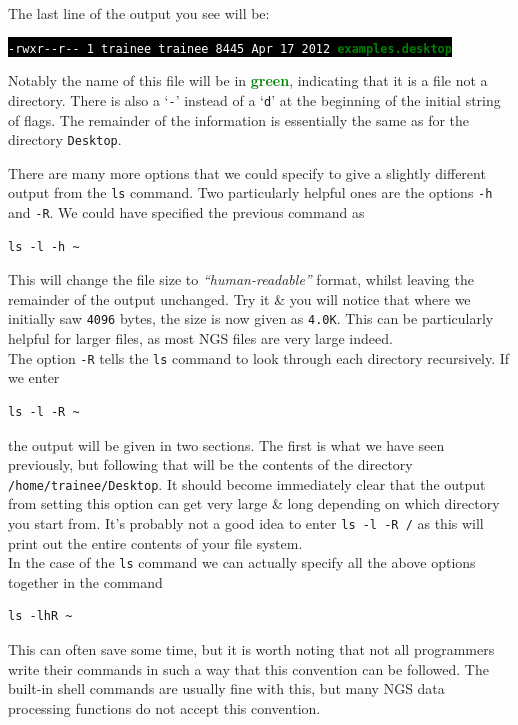 \documentclass[a4paper,12pt,twoside]{memoir}
\begin{document}
\begin{information}
The last line of the output you see will be: 
\begin{center}
\colorbox{black}{\texttt{\textcolor{white}{-rwxr-{}-r-{}- 1 trainee trainee 8445 Apr 17 2012} \textcolor{green}{\textbf{examples.desktop}}}}\\
\end{center}
Notably the name of this file will be in \textcolor{green}{\textbf{green}}, indicating that it is a file not a directory.
There is also a `\texttt{-}' instead of a `\texttt{d}' at the beginning of the initial string of flags. 
The remainder of the information is essentially the same as for the directory \texttt{Desktop}.\\
\end{information}

\begin{advanced}
There are many more options that we could specify to give a slightly different output from the \texttt{ls} command.
Two particularly helpful ones are the options \texttt{-h} and
\texttt{-R}.
We could have specified the previous command as \\
\begin{lstlisting}
ls -l -h ~
\end{lstlisting}

This will change the file size to \textit{``human-readable''} format, whilst leaving the remainder of the output unchanged.
Try it \& you will notice that where we initially saw \texttt{4096} bytes, the size is now given as \texttt{4.0K}.
This can be particularly helpful for larger files, as most NGS files are very large indeed.\\

The option \texttt{-R} tells the \texttt{ls} command to look through each directory recursively.
If we enter \\
\begin{lstlisting}
ls -l -R ~
\end{lstlisting}

the output will be given in two sections.
The first is what we have seen previously, but following that will be the contents of the directory \texttt{/home/trainee/Desktop}.
It should become immediately clear that the output from setting this option can get very large \& long depending on which directory you start from.
It's probably not a good idea to enter \texttt{ls -l -R /} as this will print out the entire contents of your file system. \\

In the case of the \texttt{ls} command we can actually specify all the above options together in the command \\
\begin{lstlisting}
ls -lhR ~
\end{lstlisting}

This can often save some time, but it is worth noting that not all programmers write their commands in such a way that this convention can be followed.
The built-in shell commands are usually fine with this, but many NGS data processing functions do not accept this convention. \\
\end{advanced}
\end{document}
